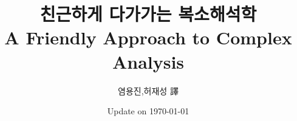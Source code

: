 \documentclass[chapter,10.5pt]{oblivoir}
\numberwithin{equation}{chapter}
\numberwithin{figure}{chapter}
\def\bf{\bfseries}
\begin{document}

\title{\bf {\huge 친근하게 다가가는 복소해석학}\\ A Friendly Approach to Complex Analysis}
\author{염용진,허재성 譯}
\date{Update on \today}
\maketitle
\thispagestyle{empty}

\clearpage

\

\clearpage



\clearpage
\setcounter{tocdepth}{2}
\setcounter{minitocdepth}{1} 

\renewcommand{\contentsname}{목 차}
\renewcommand{\bibname}{참고문헌}

\tableofcontents
    
    
%
%
\end{document}
